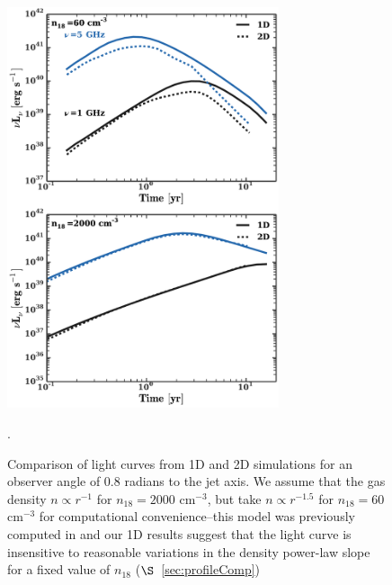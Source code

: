 \documentclass[usenatbib,fleqn]{mnras}
\begin{document}

\begin{figure}
\includegraphics[width=8cm]{1d_2d.pdf}
\caption{\label{fig:1D2DB} Comparison of light curves from 1D and 2D
  simulations for an observer angle of 0.8 radians to the jet axis. We
  assume that the gas density $n\propto r^{-1}$ for $n_{18}=2000$
  cm$^{-3}$, but take $n\propto r^{-1.5}$ for $n_{18}=60$ cm$^{-3}$
  for computational convenience--this model was previously computed in
  \citet{Mimica+2015} and our 1D results suggest that the light curve
  is insensitive to reasonable variations in the density power-law
  slope for a fixed value of $n_{18}$ ($\S$~\ref{sec:profileComp})}.
\end{figure}

\end{document}
